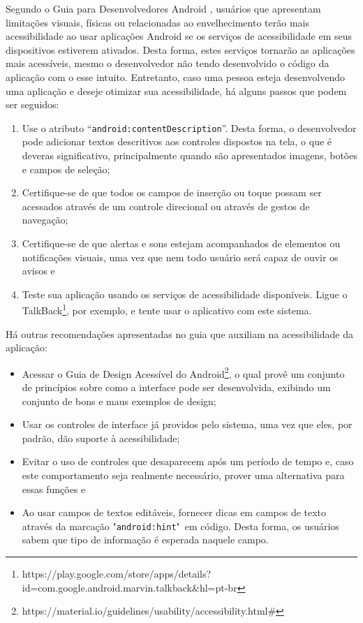 Segundo o Guia para Desenvolvedores Android \cite{DEVACCESS2016}, usuários que apresentam limitações visuais, físicas ou relacionadas ao envelhecimento terão mais acessibilidade ao usar aplicações Android se os serviços de acessibilidade em seus dispositivos estiverem ativados. Desta forma, estes serviços tornarão as aplicações mais acessíveis, mesmo o desenvolvedor não tendo desenvolvido o código da aplicação com o esse intuito. Entretanto, caso uma pessoa esteja desenvolvendo uma aplicação e deseje otimizar sua acessibilidade, há alguns passos que podem ser seguidos:
\begin{enumerate}
	\item Use o atributo “\texttt{android:contentDescription}”. Desta forma, o desenvolvedor pode adicionar textos descritivos aos controles dispostos na tela, o que é deveras significativo, principalmente quando são apresentados imagens, botões e campos de seleção;
	\item Certifique-se de que todos os campos de inserção ou toque possam ser acessados através de um controle direcional ou através de gestos de navegação;
	\item Certifique-se de que alertas e sons estejam acompanhados de elementos ou notificações visuais, uma vez que nem todo usuário será capaz de ouvir os avisos e
	\item Teste sua aplicação usando os serviços de acessibilidade disponíveis. Ligue o TalkBack\footnote{https://play.google.com/store/apps/details?id=com.google.android.marvin.talkback\&hl=pt-br}, por exemplo, e tente usar o aplicativo com este sistema.
\end{enumerate}

Há outras recomendações apresentadas no guia que auxiliam na acessibilidade da aplicação:
\begin{itemize}
	\item Acessar o Guia de Design Acessível do Android\footnote{https://material.io/guidelines/usability/accessibility.html\#}, o qual provê um conjunto de princípios sobre como a interface pode ser desenvolvida, exibindo um conjunto de bons e maus exemplos de design;
	\item Usar os controles de interface já providos pelo sistema, uma vez que eles, por padrão, dão suporte à acessibilidade;
	\item Evitar o uso de controles que desaparecem após um período de tempo e, caso este comportamento seja realmente necessário, prover uma alternativa para essas funções e
	\item Ao usar campos de textos editáveis, fornecer dicas em campos de texto através da marcação "\texttt{android:hint}"\ em código. Desta forma, os usuários sabem que tipo de informação é esperada naquele campo.
\end{itemize}

